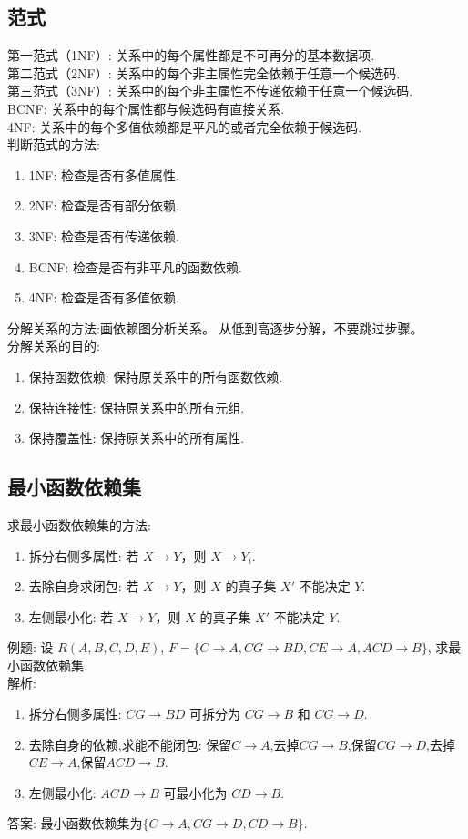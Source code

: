 \subsection{范式}
\noindent 第一范式（1NF）: 关系中的每个属性都是不可再分的基本数据项.\\
第二范式（2NF）: 关系中的每个非主属性完全依赖于任意一个候选码.\\
第三范式（3NF）: 关系中的每个非主属性不传递依赖于任意一个候选码.\\
BCNF: 关系中的每个属性都与候选码有直接关系.\\
4NF: 关系中的每个多值依赖都是平凡的或者完全依赖于候选码.\\
判断范式的方法:
\begin{enumerate}
    \item 1NF: 检查是否有多值属性.
    \item 2NF: 检查是否有部分依赖.
    \item 3NF: 检查是否有传递依赖.
    \item BCNF: 检查是否有非平凡的函数依赖.
    \item 4NF: 检查是否有多值依赖.
\end{enumerate}
分解关系的方法:画依赖图分析关系。
从低到高逐步分解，不要跳过步骤。\\
分解关系的目的:
\begin{enumerate}
    \item 保持函数依赖: 保持原关系中的所有函数依赖.
    \item 保持连接性: 保持原关系中的所有元组.
    \item 保持覆盖性: 保持原关系中的所有属性.
\end{enumerate}
\subsection{最小函数依赖集}
求最小函数依赖集的方法:
\begin{enumerate}
    \item 拆分右侧多属性: 若 $X \rightarrow Y$，则 $X \rightarrow Y_i$.
    \item 去除自身求闭包: 若 $X \rightarrow Y$，则 $X$ 的真子集 $X'$ 不能决定 $Y$.
    \item 左侧最小化: 若 $X \rightarrow Y$，则 $X$ 的真子集 $X'$ 不能决定 $Y$.
\end{enumerate}
例题:
设 $R(A, B, C, D, E)$, $F = \{C \rightarrow A, CG \rightarrow BD, CE \rightarrow A, ACD \rightarrow B\}$, 求最小函数依赖集.\\
解析:\begin{enumerate}
    \item 拆分右侧多属性: $CG \rightarrow BD$ 可拆分为 $CG \rightarrow B$ 和 $CG \rightarrow D$.
    \item 去除自身的依赖,求能不能闭包: 保留$C \rightarrow A$,去掉$CG \rightarrow B$,保留$CG \rightarrow D$,去掉$CE \rightarrow A$,保留$ACD \rightarrow B$.
    \item 左侧最小化: $ACD \rightarrow B$ 可最小化为 $CD \rightarrow B$.
    \end{enumerate}
答案: 最小函数依赖集为$\{C \rightarrow A,CG \rightarrow D, CD \rightarrow B\}$.
